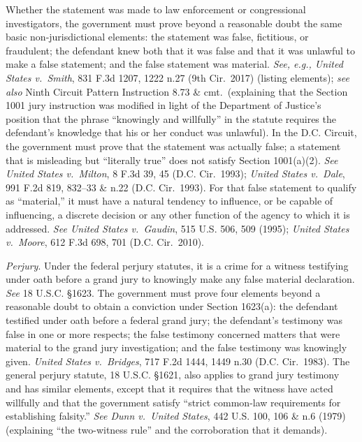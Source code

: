Whether the statement was made to law enforcement or congressional investigators, the government must prove beyond a reasonable doubt the same basic non-jurisdictional elements: the statement was false, fictitious, or fraudulent; the defendant knew both that it was false and that it was unlawful to make a false statement; and the false statement was material.
\textit{See, e.g., United States v.\ Smith}, 831 F.3d 1207, 1222 n.27 (9th Cir.~2017) (listing elements); \textit{see also} Ninth Circuit Pattern Instruction 8.73 \& cmt.\ (explaining that the Section 1001 jury instruction was modified in light of the Department of Justice's position that the phrase ``knowingly and willfully'' in the statute requires the defendant's knowledge that his or her conduct was unlawful).
In the D.C. Circuit, the government must prove that the statement was actually false; a statement that is misleading but ``literally true'' does not satisfy Section 1001(a)(2).
\textit{See United States v.\ Milton}, 8 F.3d 39, 45 (D.C. Cir.~1993); \textit{United States v.\ Dale}, 991 F.2d 819, 832--33 \& n.22 (D.C. Cir.~1993).
For that false statement to qualify as ``material,'' it must have a natural tendency to influence, or be capable of influencing, a discrete decision or any other function of the agency to which it is addressed.
\textit{See United States v.\ Gaudin}, 515 U.S. 506, 509 (1995); \textit{United States v.\ Moore}, 612 F.3d 698, 701 (D.C. Cir.~2010).

\textit{Perjury}.
Under the federal perjury statutes, it is a crime for a witness testifying under oath before a grand jury to knowingly make any false material declaration.
\textit{See} 18 U.S.C. \S 1623.
The government must prove four elements beyond a reasonable doubt to obtain a conviction under Section 1623(a): the defendant testified under oath before a federal grand jury; the defendant's testimony was false in one or more respects; the false testimony concerned matters that were material to the grand jury investigation; and the false testimony was knowingly given.
\textit{United States v.\ Bridges}, 717 F.2d 1444, 1449 n.30 (D.C. Cir.~1983).
The general perjury statute, 18 U.S.C. \S 1621, also applies to grand jury testimony and has similar elements, except that it requires that the witness have acted willfully and that the government satisfy ``strict common-law requirements for establishing falsity.''
\textit{See Dunn v.\ United States}, 442 U.S. 100, 106 \& n.6 (1979) (explaining ``the two-witness rule'' and the corroboration that it demands).

